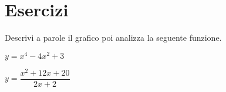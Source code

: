 
\section{Esercizi}

% 

\begin{esercizio}\label{ese:03.1}
Descrivi a parole il grafico poi analizza la seguente funzione.

\begin{multicols}{2}
 \begin{enumeratea}
  \item 
\(y=x^4-4x^2+3\)
 \begin{center}
 \scalebox{.8}{\funzioneb}
 \end{center}
  \item 
\(y=\dfrac{x^2+12x+20}{2x+2}\)
 \begin{center}
 \scalebox{.5}{\funzionec}
 \end{center}
 \end{enumeratea}
\end{multicols}
\end{esercizio}

% 
% 
% 
%  

